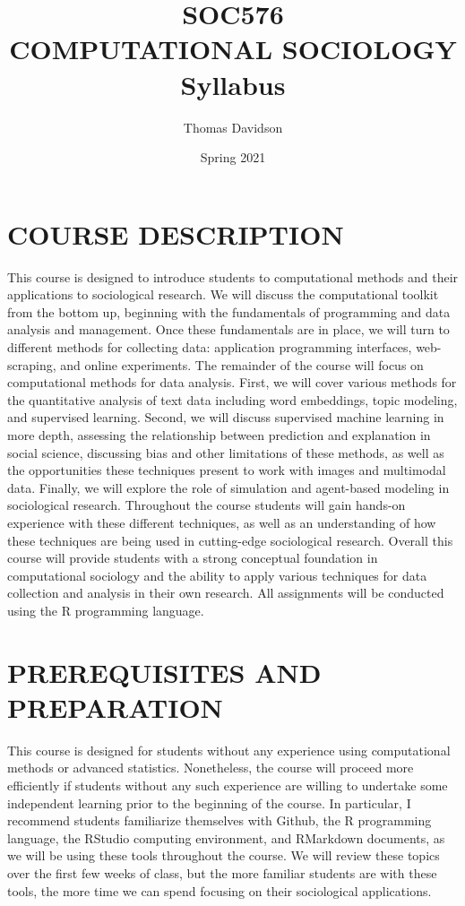 \documentclass[
  10pt,
]{article}
\title{SOC576\\
\hspace*{0.333em}COMPUTATIONAL SOCIOLOGY\\
\hspace*{0.333em}Syllabus}
\author{Thomas Davidson}
\date{Spring 2021}
\begin{document}
\maketitle

\hypertarget{course-description}{%
\section{COURSE DESCRIPTION}\label{course-description}}

This course is designed to introduce students to computational methods
and their applications to sociological research. We will discuss the
computational toolkit from the bottom up, beginning with the
fundamentals of programming and data analysis and management. Once these
fundamentals are in place, we will turn to different methods for
collecting data: application programming interfaces, web-scraping, and
online experiments. The remainder of the course will focus on
computational methods for data analysis. First, we will cover various
methods for the quantitative analysis of text data including word
embeddings, topic modeling, and supervised learning. Second, we will
discuss supervised machine learning in more depth, assessing the
relationship between prediction and explanation in social science,
discussing bias and other limitations of these methods, as well as the
opportunities these techniques present to work with images and
multimodal data. Finally, we will explore the role of simulation and
agent-based modeling in sociological research. Throughout the course
students will gain hands-on experience with these different techniques,
as well as an understanding of how these techniques are being used in
cutting-edge sociological research. Overall this course will provide
students with a strong conceptual foundation in computational sociology
and the ability to apply various techniques for data collection and
analysis in their own research. All assignments will be conducted using
the R programming language.

\hypertarget{prerequisites-and-preparation}{%
\section{PREREQUISITES AND
PREPARATION}\label{prerequisites-and-preparation}}

This course is designed for students without any experience using
computational methods or advanced statistics. Nonetheless, the course
will proceed more efficiently if students without any such experience
are willing to undertake some independent learning prior to the
beginning of the course. In particular, I recommend students familiarize
themselves with Github, the R programming language, the RStudio
computing environment, and RMarkdown documents, as we will be using
these tools throughout the course. We will review these topics over the
first few weeks of class, but the more familiar students are with these
tools, the more time we can spend focusing on their sociological
applications.
\end{document}
